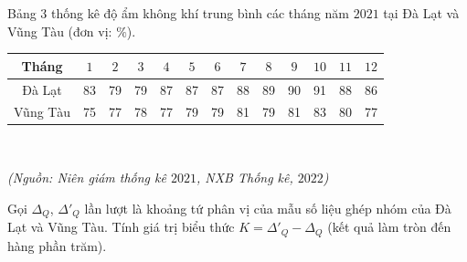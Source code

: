 \begin{bt}%

	Bảng  $3$ thống kê độ ẩm không khí trung bình các tháng năm $2021$ tại Đà Lạt và Vũng Tàu (đơn vị: $\%$). 
	\begin{center}
		\begin{tabular}{*{13}{|c}|}
			\hline
			Tháng &$1$&$2$&$3$&$4$&$5$&$6$&$7$&$8$&$9$&$10$&$11$&$12$ \\
			\hline
			Đà Lạt &83&79&79&87&87&87&88&89&90&91&88&86 \\
			\hline
			Vũng Tàu &75&77&78&77&79&79&81&79&81&83&80&77 \\
			\hline
		\end{tabular}\\
	\end{center}
	\begin{flushright}
		\textit{(Nguồn: Niên giám thống kê $2021$, NXB Thống kê, $2022$)}
	\end{flushright}
	Gọi $\Delta_Q$, $\Delta'_Q$ lần lượt là khoảng tứ phân vị của mẫu số liệu ghép nhóm của Đà Lạt và Vũng Tàu. Tính giá trị biểu thức $K=\Delta '_Q-\Delta_Q$ (kết quả làm tròn đến hàng phần trăm).
\end{bt}
